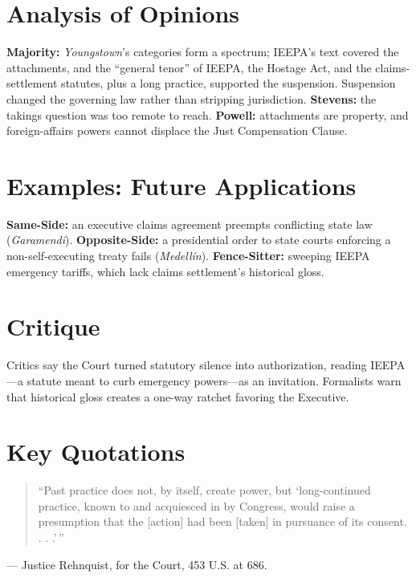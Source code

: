 \documentclass[12pt]{article}
\begin{document}
\section{Analysis of Opinions}
\textbf{Majority:} \textit{Youngstown}'s categories form a spectrum; IEEPA's text covered the attachments, and the ``general tenor'' of IEEPA, the Hostage Act, and the claims-settlement statutes, plus a long practice, supported the suspension. Suspension changed the governing law rather than stripping jurisdiction. \textbf{Stevens:} the takings question was too remote to reach. \textbf{Powell:} attachments are property, and foreign-affairs powers cannot displace the Just Compensation Clause.

\section{Examples: Future Applications}
\textbf{Same-Side:} an executive claims agreement preempts conflicting state law (\textit{Garamendi}). \textbf{Opposite-Side:} a presidential order to state courts enforcing a non-self-executing treaty fails (\textit{Medell\'in}). \textbf{Fence-Sitter:} sweeping IEEPA emergency tariffs, which lack claims settlement's historical gloss.

\section{Critique}
Critics say the Court turned statutory silence into authorization, reading IEEPA---a statute meant to curb emergency powers---as an invitation. Formalists warn that historical gloss creates a one-way ratchet favoring the Executive.

\section{Key Quotations}
\begin{quote}
``Past practice does not, by itself, create power, but `long-continued practice, known to and acquiesced in by Congress, would raise a presumption that the [action] had been [taken] in pursuance of its consent. . . .'\,''
\end{quote}
\noindent --- Justice Rehnquist, for the Court, 453 U.S. at 686.
\end{document}
